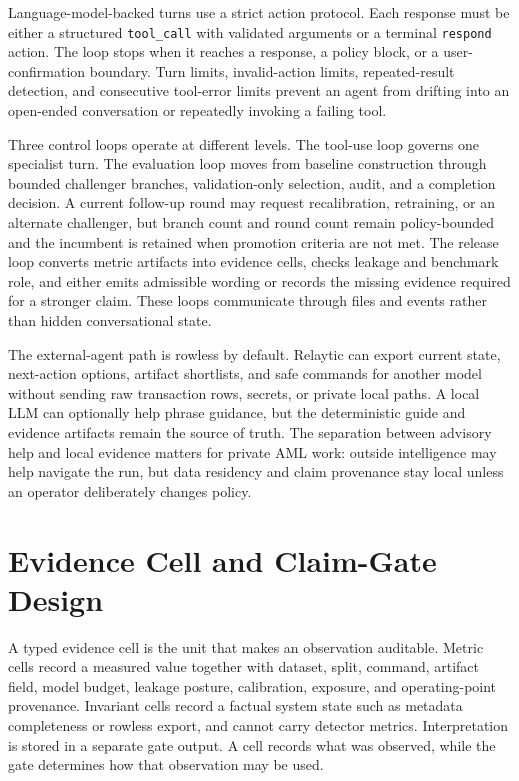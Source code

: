 \documentclass[11pt]{article}
\begin{document}
Language-model-backed turns use a strict action protocol. Each response must be either a structured \nolinkurl{tool_call} with validated arguments or a terminal \nolinkurl{respond} action. The loop stops when it reaches a response, a policy block, or a user-confirmation boundary. Turn limits, invalid-action limits, repeated-result detection, and consecutive tool-error limits prevent an agent from drifting into an open-ended conversation or repeatedly invoking a failing tool.

Three control loops operate at different levels. The tool-use loop governs one specialist turn. The evaluation loop moves from baseline construction through bounded challenger branches, validation-only selection, audit, and a completion decision. A current follow-up round may request recalibration, retraining, or an alternate challenger, but branch count and round count remain policy-bounded and the incumbent is retained when promotion criteria are not met. The release loop converts metric artifacts into evidence cells, checks leakage and benchmark role, and either emits admissible wording or records the missing evidence required for a stronger claim. These loops communicate through files and events rather than hidden conversational state.

The external-agent path is rowless by default. Relaytic can export current state, next-action options, artifact shortlists, and safe commands for another model without sending raw transaction rows, secrets, or private local paths. A local LLM can optionally help phrase guidance, but the deterministic guide and evidence artifacts remain the source of truth. The separation between advisory help and local evidence matters for private AML work: outside intelligence may help navigate the run, but data residency and claim provenance stay local unless an operator deliberately changes policy.

\section{Evidence Cell and Claim-Gate Design}

A typed evidence cell is the unit that makes an observation auditable. Metric cells record a measured value together with dataset, split, command, artifact field, model budget, leakage posture, calibration, exposure, and operating-point provenance. Invariant cells record a factual system state such as metadata completeness or rowless export, and cannot carry detector metrics. Interpretation is stored in a separate gate output. A cell records what was observed, while the gate determines how that observation may be used.
\end{document}
